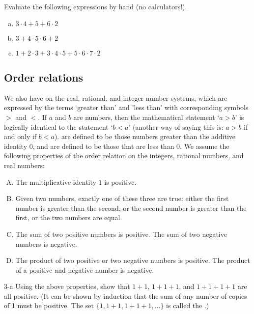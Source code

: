 \begin{exercise}{}
Evaluate the following expressions by hand (no calculators!).
\begin{enumerate}[(a)]
\item
$3 \cdot 4 + 5 + 6 \cdot 2$
\item
$3 + 4 \cdot 5 \cdot 6 + 2$
\item
$1 + 2 \cdot 3 + 3 \cdot 4 \cdot 5 + 5 \cdot 6 \cdot 7 \cdot 2$
\end{enumerate}
\end{exercise}


\subsection{Order relations}\label{subsec:orderprop}
We also have  on the real, rational, and integer number systems, which are expressed by the terms `greater than'  and 'less than' with corresponding symbols $>$ and $<$. If $a$ and $b$ are numbers, then  the mathematical statement `$a > b$' is logically identical to the statement  `$b<a$' (another way of saying this is: $a > b$ if and only if $b < a$).  are defined to be those numbers greater than the additive identity 0, and  are defined to be those that  are less than 0. We assume the following properties of the order relation on the integers, rational numbers, and real numbers:

\begin{enumerate}[(A)] 
\item
The multiplicative identity $1$ is positive.
\item
Given two numbers, exactly one of these three are true: either the first number is greater than the second, or the second number is greater than the first, or the two numbers are equal.
\item
The sum of two  positive numbers  is positive. The sum of two negative numbers is negative.
\item
The product of two  positive or two negative numbers is positive. The product of a positive and negative number is negative.
\end{enumerate}

\begin{exercise}{3-a}
Using the above properties, show that $1+1$, $1+1+1$, and $1+1+1+1$ are all positive. (It can be shown by induction that the sum of any number of copies of 1 must be positive. The set $\{1, 1+1, 1+1+1, \ldots\}$ is called the .)
\end{exercise}



